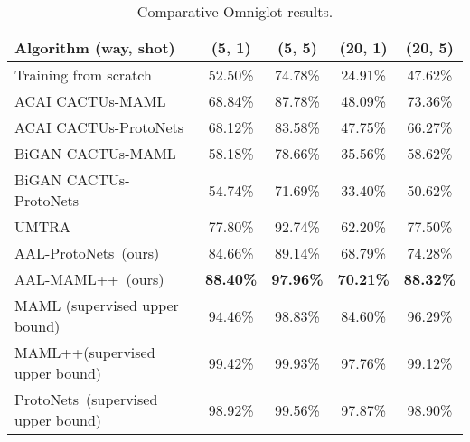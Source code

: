 \documentclass{article}
\newcommand{\umaml}{AAL-MAML++}
\newcommand{\maml}{MAML++}
\newcommand{\proto}{ProtoNets}
\newcommand{\uproto}{AAL-ProtoNets}
\begin{document}
\begin{table*}[!ht]
\begin{center}
\begin{tabular}{@{}lcccc@{}}
\toprule
Algorithm \hfill (way, shot) & (5, 1) & (5, 5) & (20, 1) & (20, 5) \\
\midrule
Training from scratch & 52.50\% & 74.78\% & 24.91\% & 47.62\% \\
ACAI CACTUs-MAML       & 68.84\% & 87.78\% & 48.09\% & 73.36\% \\
ACAI CACTUs-ProtoNets  & 68.12\% & 83.58\% & 47.75\% & 66.27\% \\
BiGAN CACTUs-MAML       & 58.18\% & 78.66\% & 35.56\% & 58.62\% \\
BiGAN CACTUs-ProtoNets  & 54.74\% & 71.69\% & 33.40\% & 50.62\% \\
UMTRA                   & 77.80\% & 92.74\% & 62.20\% & 77.50\% \\
\uproto\ (ours)              & 84.66\% & 89.14\% & 68.79\% & 74.28\% \\
\umaml\ (ours)              & \textbf{88.40\%} & \textbf{97.96\%} & \textbf{70.21\%} & \textbf{88.32\%} \\
\midrule
MAML (supervised upper bound) & 94.46\% & 98.83\% & 84.60\% & 96.29\% \\
\maml (supervised upper bound)\ & 99.42\% & 99.93\% & 97.76\% & 99.12\% \\
\proto\ (supervised upper bound) & 98.92\% & 99.56\% & 97.87\% & 98.90\% \\
\bottomrule
\end{tabular}
\caption{Comparative Omniglot results.}
\label{table:compare-omniglot}
\end{center}
\vspace{-8mm}
\end{table*}
\end{document}
